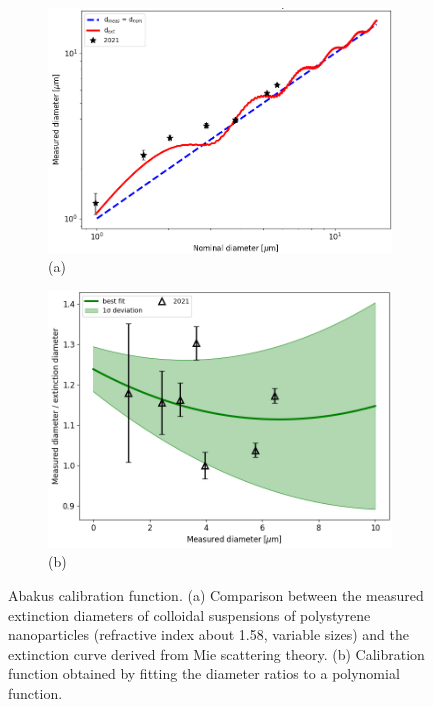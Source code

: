 \documentclass[a4paper, 11pt]{report}
\begin{document}
\begin{figure}[!htb]
	\captionsetup[subfigure]{labelformat=empty}
	\begin{subfigure}{.5\textwidth}
	\centering
	\includegraphics[scale=0.41]{abakus_calibration_1.png}
	\caption{(a)}
	\end{subfigure} 
	\begin{subfigure}{.5\textwidth}
	\centering	
	\includegraphics[scale=0.42]{abakus_calibration_2.png}
	\caption{(b)}
	\end{subfigure} 
	\caption{Abakus calibration function. (a) Comparison between the measured extinction diameters of colloidal suspensions of polystyrene nanoparticles (refractive index about 1.58, variable sizes) and the extinction curve derived from Mie scattering theory. (b) Calibration function obtained by fitting the diameter ratios to a polynomial function.}
	\label{calibration_plot}
\end{figure}
\end{document}
